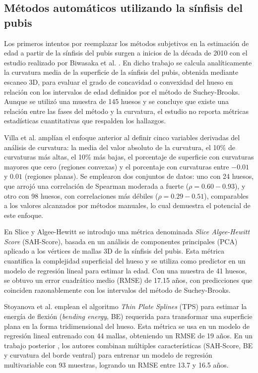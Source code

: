 \subsection{Métodos automáticos utilizando la sínfisis del pubis}

Los primeros intentos por reemplazar los métodos subjetivos en la estimación de edad a partir de la sínfisis del pubis surgen a inicios de la década de 2010 con el estudio realizado por Biwasaka et al. \cite{biwasaka2013three}. En dicho trabajo se calcula analíticamente la curvatura media de la superficie de la sínfisis del pubis, obtenida mediante escaneo 3D, para evaluar el grado de concavidad o convexidad del hueso en relación con los intervalos de edad definidos por el método de Suchey-Brooks. Aunque se utilizó una muestra de 145 huesos y se concluye que existe una relación entre las fases del método y la curvatura, el estudio no reporta métricas estadísticas cuantitativas que respalden los hallazgos.

Villa et al. \cite{villa2015quantitative} amplían el enfoque anterior al definir cinco variables derivadas del análisis de curvatura: la media del valor absoluto de la curvatura, el 10\% de curvaturas más altas, el 10\% más bajas, el porcentaje de superficie con curvaturas mayores que cero (regiones convexas) y el porcentaje con curvaturas entre $-0.01$ y $0.01$ (regiones planas). Se emplearon dos conjuntos de datos: uno con 24 huesos, que arrojó una correlación de Spearman moderada a fuerte ($\rho=0.60-0.93$), y otro con 98 huesos, con correlaciones más débiles ($\rho=0.29-0.51$), comparables a los valores alcanzados por métodos manuales, lo cual demuestra el potencial de este enfoque.

En Slice y Algee-Hewitt \cite{slice2015modeling} se introdujo una métrica denominada \textit{Slice Algee-Hewitt Score} (SAH-Score), basada en un análisis de componentes principales (PCA) aplicado a los vértices de mallas 3D de la sínfisis del pubis. Esta métrica cuantifica la complejidad superficial del hueso y se utiliza como predictor en un modelo de regresión lineal para estimar la edad. Con una muestra de 41 huesos, se obtuvo un error cuadrático medio (RMSE) de 17.15 años, con predicciones que coinciden razonablemente con los intervalos del método de Suchey-Brooks.

Stoyanova et al. \cite{stoyanova2015enhanced} emplean el algoritmo \textit{Thin Plate Splines} (TPS) para estimar la energía de flexión (\textit{bending energy}, BE) requerida para transformar una superficie plana en la forma tridimensional del hueso. Esta métrica se usa en un modelo de regresión lineal entrenado con 44 mallas, obteniendo un RMSE de 19 años. En un trabajo posterior \cite{stoyanova2017computational}, los autores combinan múltiples características (SAH-Score, BE y curvatura del borde ventral) para entrenar un modelo de regresión multivariable con 93 muestras, logrando un RMSE entre 13.7 y 16.5 años.

